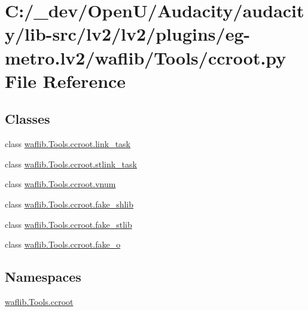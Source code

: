 \hypertarget{lv2_2plugins_2eg-metro_8lv2_2waflib_2_tools_2ccroot_8py}{}\section{C\+:/\+\_\+dev/\+Open\+U/\+Audacity/audacity/lib-\/src/lv2/lv2/plugins/eg-\/metro.lv2/waflib/\+Tools/ccroot.py File Reference}
\label{lv2_2plugins_2eg-metro_8lv2_2waflib_2_tools_2ccroot_8py}
\subsection*{Classes}
\begin{DoxyCompactItemize}
\item 
class \hyperlink{classwaflib_1_1_tools_1_1ccroot_1_1link__task}{waflib.\+Tools.\+ccroot.\+link\+\_\+task}
\item 
class \hyperlink{classwaflib_1_1_tools_1_1ccroot_1_1stlink__task}{waflib.\+Tools.\+ccroot.\+stlink\+\_\+task}
\item 
class \hyperlink{classwaflib_1_1_tools_1_1ccroot_1_1vnum}{waflib.\+Tools.\+ccroot.\+vnum}
\item 
class \hyperlink{classwaflib_1_1_tools_1_1ccroot_1_1fake__shlib}{waflib.\+Tools.\+ccroot.\+fake\+\_\+shlib}
\item 
class \hyperlink{classwaflib_1_1_tools_1_1ccroot_1_1fake__stlib}{waflib.\+Tools.\+ccroot.\+fake\+\_\+stlib}
\item 
class \hyperlink{classwaflib_1_1_tools_1_1ccroot_1_1fake__o}{waflib.\+Tools.\+ccroot.\+fake\+\_\+o}
\end{DoxyCompactItemize}
\subsection*{Namespaces}
\begin{DoxyCompactItemize}
\item 
 \hyperlink{namespacewaflib_1_1_tools_1_1ccroot}{waflib.\+Tools.\+ccroot}
\end{DoxyCompactItemize}
